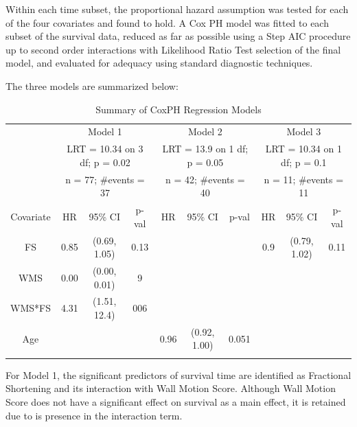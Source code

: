 \documentclass[
]{article}
\begin{document}
Within each time subset, the proportional hazard assumption was tested
for each of the four covariates and found to hold. A Cox PH model was
fitted to each subset of the survival data, reduced as far as possible
using a Step AIC procedure up to second order interactions with
Likelihood Ratio Test selection of the final model, and evaluated for
adequacy using standard diagnostic techniques.

The three models are summarized below:

\begin{table}[H]

\caption{\label{tab:unnamed-chunk-3}Summary of CoxPH Regression Models}
\centering
\begin{tabular}[t]{c|c|c|c|c|c|c|c|c|c}
\hline
\multicolumn{1}{c|}{ } & \multicolumn{3}{c|}{Model 1} & \multicolumn{3}{c|}{Model 2} & \multicolumn{3}{c}{Model 3} \\
\cline{2-4} \cline{5-7} \cline{8-10}
\multicolumn{1}{c|}{\bgroup\fontsize{8}{10}\selectfont  \egroup{}} & \multicolumn{3}{c|}{\bgroup\fontsize{8}{10}\selectfont LRT = 10.34 on 3 df; p = 0.02\egroup{}} & \multicolumn{3}{c|}{\bgroup\fontsize{8}{10}\selectfont LRT = 13.9 on 1 df; p = 0.05\egroup{}} & \multicolumn{3}{c}{\bgroup\fontsize{8}{10}\selectfont LRT = 10.34 on 1 df; p = 0.1\egroup{}} \\
\cline{2-4} \cline{5-7} \cline{8-10}
\multicolumn{1}{c|}{\bgroup\fontsize{8}{10}\selectfont  \egroup{}} & \multicolumn{3}{c|}{\bgroup\fontsize{8}{10}\selectfont n = 77; \#events = 37\egroup{}} & \multicolumn{3}{c|}{\bgroup\fontsize{8}{10}\selectfont n = 42; \#events = 40\egroup{}} & \multicolumn{3}{c}{\bgroup\fontsize{8}{10}\selectfont n = 11; \#events = 11\egroup{}} \\
\cline{2-4} \cline{5-7} \cline{8-10}
Covariate & HR & 95\% CI & p-val & HR & 95\% CI & p-val & HR & 95\% CI & p-val\\
\hline
FS & 0.85 & (0.69, 1.05) & 0.13 &  &  &  & 0.9 & (0.79, 1.02) & 0.11\\
\hline
WMS & 0.00 & (0.00, 0.01) & 9 &  &  &  &  &  & \\
\hline
WMS*FS & 4.31 & (1.51, 12.4) & 006 &  &  &  &  &  & \\
\hline
Age &  &  &  & 0.96 & (0.92, 1.00) & 0.051 &  &  & \\
\hline
 &  &  &  &  &  &  &  &  & \\
\hline
\end{tabular}
\end{table}

For Model 1, the significant predictors of survival time are identified
as Fractional Shortening and its interaction with Wall Motion Score.
Although Wall Motion Score does not have a significant effect on
survival as a main effect, it is retained due to is presence in the
interaction term.
\end{document}

